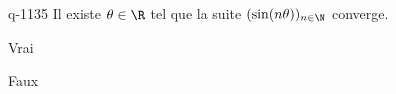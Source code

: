 \begin{truefalse}{q-1135}
Il existe $\theta\in\R$ tel que la suite $(\sin(n\theta))_{n\in\N}$ converge. 
\item* Vrai
\item Faux
\end{truefalse}

